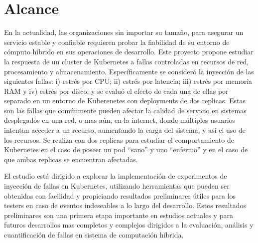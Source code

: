 \section{Alcance}


\par En la actualidad, las organizaciones sin importar su tamaño, para asegurar un servicio estable y confiable requieren probar la fiabilidad de su entorno de cómputo híbrido en sus operaciones de desarrollo. Este proyecto propone estudiar la respuesta de un cluster de Kubernetes a fallas controladas en recursos de red, procesamiento y almacenamiento. Específicamente se consider\'o la inyecci\'on de las siguientes fallas: i) estr\'es por CPU; ii) estr\'es por latencia; iii) estr\'es por memoria RAM y iv) estr\'es por disco; y se evaluó el efecto de cada una de ellas por separado en un entorno de Kuberenetes con deployments de dos replicas. Estas son las fallas que comúnmente pueden afectar la calidad de servicio en sistemas desplegados en una red, o mas a\'un, en la internet, donde m\'ultiples usuarios intentan acceder a un recurso, aumentando la carga del sistema, y as\'i el uso de los recursos. Se realiza con dos replicas para estudiar el comportamiento de Kubernetes en el caso de poseer un pod ``sano'' y uno ``enfermo'' y en el caso de que ambas replicas se encuentran afectadas. \\ %


\par El estudio está dirigido a explorar la implementación de experimentos de inyección de fallas en Kubernetes, utilizando herramientas que pueden ser obtenidas con facilidad y propiciando resultados preliminares útiles para los testers en caso de eventos indeseables a lo largo del desarrollo. Estos resultados preliminares son una primera etapa importante en estudios actuales y para futuros desarrollos mas completos y complejos dirigidos a la evaluación, análisis y cuantificación de fallas en sistema de computación híbrida. \\

